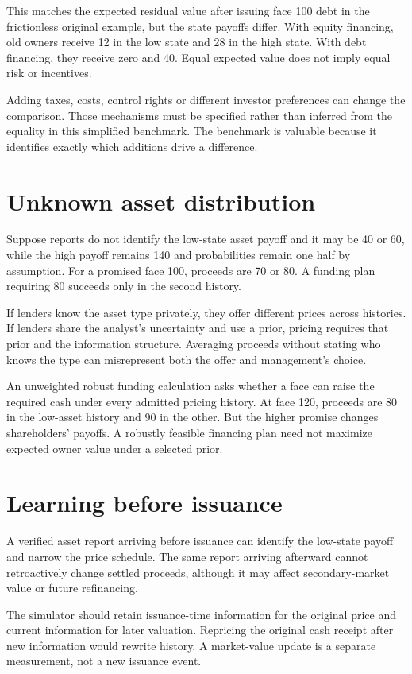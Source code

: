 This matches the expected residual value after issuing face 100 debt in the frictionless original example, but the state payoffs differ. With equity financing, old owners receive 12 in the low state and 28 in the high state. With debt financing, they receive zero and 40. Equal expected value does not imply equal risk or incentives.

Adding taxes, costs, control rights or different investor preferences can change the comparison. Those mechanisms must be specified rather than inferred from the equality in this simplified benchmark. The benchmark is valuable because it identifies exactly which additions drive a difference.

\section{Unknown asset distribution}
Suppose reports do not identify the low-state asset payoff and it may be 40 or 60, while the high payoff remains 140 and probabilities remain one half by assumption. For a promised face 100, proceeds are 70 or 80. A funding plan requiring 80 succeeds only in the second history.

If lenders know the asset type privately, they offer different prices across histories. If lenders share the analyst's uncertainty and use a prior, pricing requires that prior and the information structure. Averaging proceeds without stating who knows the type can misrepresent both the offer and management's choice.

An unweighted robust funding calculation asks whether a face can raise the required cash under every admitted pricing history. At face 120, proceeds are 80 in the low-asset history and 90 in the other. But the higher promise changes shareholders' payoffs. A robustly feasible financing plan need not maximize expected owner value under a selected prior.

\section{Learning before issuance}
A verified asset report arriving before issuance can identify the low-state payoff and narrow the price schedule. The same report arriving afterward cannot retroactively change settled proceeds, although it may affect secondary-market value or future refinancing.

The simulator should retain issuance-time information for the original price and current information for later valuation. Repricing the original cash receipt after new information would rewrite history. A market-value update is a separate measurement, not a new issuance event.

